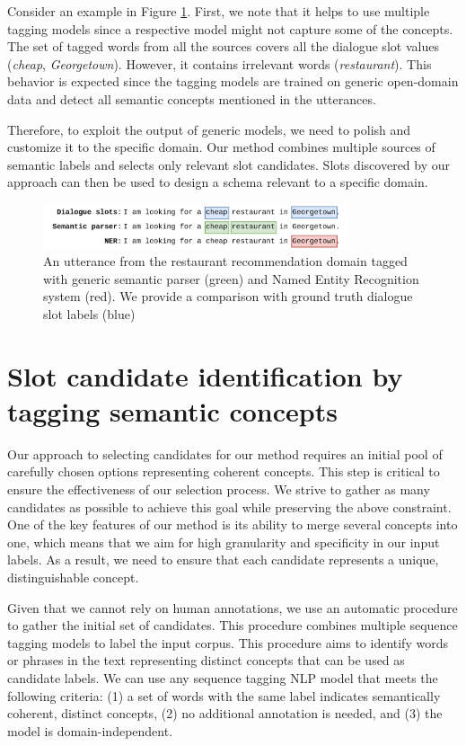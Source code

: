 Consider an example in Figure \ref{fig:tagged_example}.
First, we note that it helps to use multiple tagging models since a respective model might not capture some of the concepts.
The set of tagged words from all the sources covers all the dialogue slot values (\emph{cheap}, \emph{Georgetown}).
However, it contains irrelevant words (\emph{restaurant}).
This behavior is expected since the tagging models are trained on generic open-domain data and detect all semantic concepts mentioned in the utterances.

Therefore, to exploit the output of generic models, we need to polish and customize it to the specific domain.
Our method combines multiple sources of semantic labels and selects only relevant slot candidates.
Slots discovered by our approach can then be used to design a schema relevant to a specific domain.
\begin{figure}[h]
\centering
    \includegraphics[width=0.8\textwidth]{images/tagging-example.png}
    \caption{An utterance from the restaurant recommendation domain tagged with generic semantic parser (green) and Named Entity Recognition system (red). We provide a comparison with ground truth dialogue slot labels (blue)}
    \label{fig:tagged_example}
\end{figure}

\section{Slot candidate identification by tagging semantic concepts}
\label{04:sec:tagging_concepts}

Our approach to selecting candidates for our method requires an initial pool of carefully chosen options representing coherent concepts. This step is critical to ensure the effectiveness of our selection process. We strive to gather as many candidates as possible to achieve this goal while preserving the above constraint.
One of the key features of our method is its ability to merge several concepts into one, which means that we aim for high granularity and specificity in our input labels. As a result, we need to ensure that each candidate represents a unique, distinguishable concept.

Given that we cannot rely on human annotations, we use an automatic procedure to gather the initial set of candidates.
This procedure combines multiple sequence tagging models to label the input corpus.
This procedure aims to identify words or phrases in the text representing distinct concepts that can be used as candidate labels.
We can use any sequence tagging NLP model that meets the following criteria: (1) a set of words with the same label indicates semantically coherent, distinct concepts, (2) no additional annotation is needed, and (3) the model is domain-independent.

